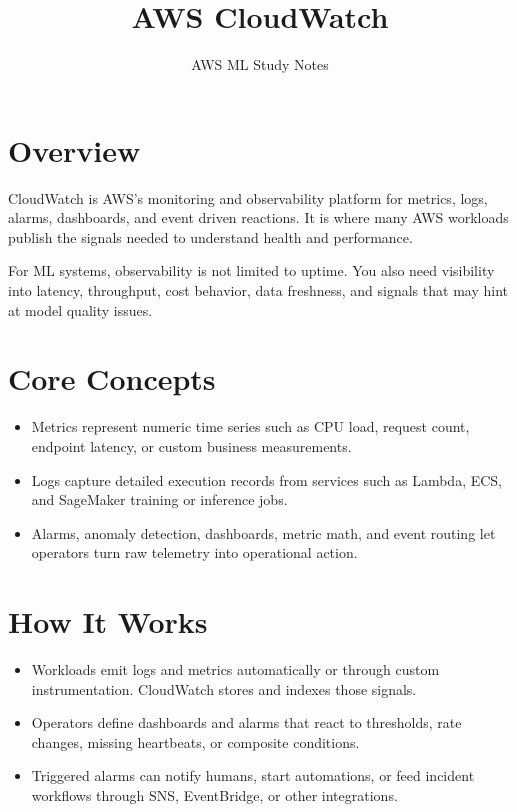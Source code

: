\documentclass[10pt,twocolumn]{article}
\begin{document}
\title{\vspace{-1.6cm}AWS CloudWatch}
\author{AWS ML Study Notes}
\date{}
\maketitle
\small

\section*{Overview}
CloudWatch is AWS's monitoring and observability platform for metrics, logs, alarms, dashboards, and event driven reactions. It is where many AWS workloads publish the signals needed to understand health and performance.

For ML systems, observability is not limited to uptime. You also need visibility into latency, throughput, cost behavior, data freshness, and signals that may hint at model quality issues.

\section*{Core Concepts}
\begin{itemize}
\item Metrics represent numeric time series such as CPU load, request count, endpoint latency, or custom business measurements.
\item Logs capture detailed execution records from services such as Lambda, ECS, and SageMaker training or inference jobs.
\item Alarms, anomaly detection, dashboards, metric math, and event routing let operators turn raw telemetry into operational action.
\end{itemize}

\section*{How It Works}
\begin{itemize}
\item Workloads emit logs and metrics automatically or through custom instrumentation. CloudWatch stores and indexes those signals.
\item Operators define dashboards and alarms that react to thresholds, rate changes, missing heartbeats, or composite conditions.
\item Triggered alarms can notify humans, start automations, or feed incident workflows through SNS, EventBridge, or other integrations.
\end{itemize}
\end{document}
